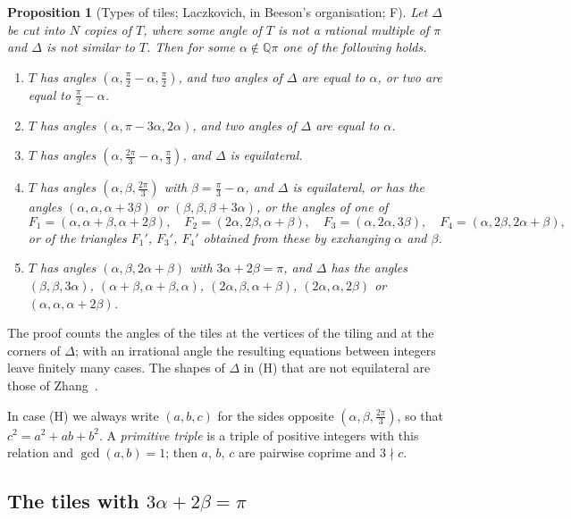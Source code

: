 \documentclass[11pt,reqno]{amsart}
\theoremstyle{plain}
\newtheorem{proposition}[theorem]{Proposition}
\theoremstyle{definition}
\newcommand{\Q}{\mathbb{Q}}
\newcommand{\sF}{\textup{\textsf{F}}}
\begin{document}
\begin{proposition}[Types of tiles; Laczkovich, in Beeson's organisation; \sF]\label{prop:types}
Let $\Delta$ be cut into $N$ copies of $T$, where some angle of $T$ is not a rational multiple of $\pi$ and
$\Delta$ is not similar to $T$. Then for some $\alpha\notin\Q\pi$ one of the following holds.
\begin{enumerate}
\item[\textup{(R)}] $T$ has angles $(\alpha,\frac\pi2-\alpha,\frac\pi2)$, and two angles of $\Delta$ are equal
to $\alpha$, or two are equal to $\frac\pi2-\alpha$.
\item[\textup{(D)}] $T$ has angles $(\alpha,\pi-3\alpha,2\alpha)$, and two angles of $\Delta$ are equal to
$\alpha$.
\item[\textup{(S)}] $T$ has angles $(\alpha,\frac{2\pi}3-\alpha,\frac\pi3)$, and $\Delta$ is equilateral.
\item[\textup{(H)}] $T$ has angles $(\alpha,\beta,\frac{2\pi}3)$ with $\beta=\frac\pi3-\alpha$, and $\Delta$ is
equilateral, or has the angles $(\alpha,\alpha,\alpha+3\beta)$ or $(\beta,\beta,\beta+3\alpha)$, or the
angles of one of
\[
F_1=(\alpha,\alpha+\beta,\alpha+2\beta),\quad F_2=(2\alpha,2\beta,\alpha+\beta),\quad
F_3=(\alpha,2\alpha,3\beta),\quad F_4=(\alpha,2\beta,2\alpha+\beta),
\]
or of the triangles $F_1'$, $F_3'$, $F_4'$ obtained from these by exchanging $\alpha$ and $\beta$.
\item[\textup{(T)}] $T$ has angles $(\alpha,\beta,2\alpha+\beta)$ with $3\alpha+2\beta=\pi$, and $\Delta$ has
the angles $(\beta,\beta,3\alpha)$, $(\alpha+\beta,\alpha+\beta,\alpha)$, $(2\alpha,\beta,\alpha+\beta)$,
$(2\alpha,\alpha,2\beta)$ or $(\alpha,\alpha,\alpha+2\beta)$.
\end{enumerate}
\end{proposition}

The proof counts the angles of the tiles at the vertices of the tiling and at the corners of $\Delta$; with
an irrational angle the resulting equations between integers leave finitely many cases. The shapes of $\Delta$ in (H)
that are not equilateral are those of Zhang~\cite{Zhang}.

In case (H) we always write $(a,b,c)$ for the sides opposite $(\alpha,\beta,\frac{2\pi}3)$, so that
$c^2=a^2+ab+b^2$. A \emph{primitive triple} is a triple of positive integers with this relation and
$\gcd(a,b)=1$; then $a$, $b$, $c$ are pairwise coprime and $3\nmid c$.

\subsection{The tiles with $3\alpha+2\beta=\pi$}
\end{document}
